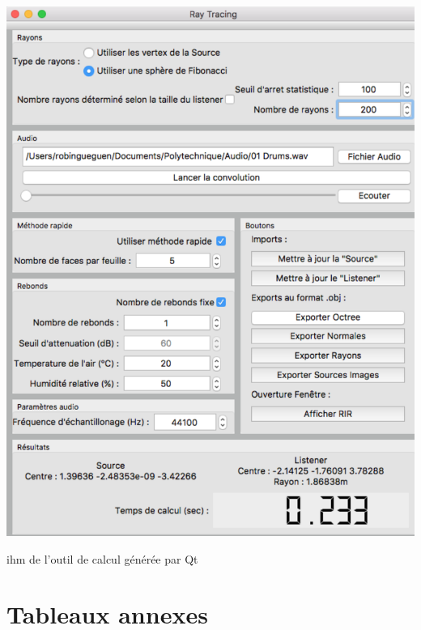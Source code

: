 \begin{figureth}
	\includegraphics[width=\linewidth]{images/ihm}
	\caption{\gls{ihm} de l'outil de calcul générée par Qt}
	\label{ihm}
\end{figureth}

\section{Tableaux annexes}




 
 